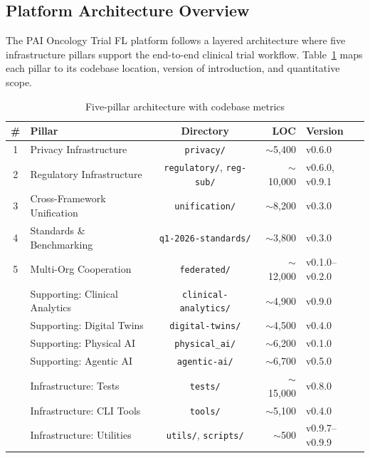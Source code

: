 \documentclass[10pt]{article}
\begin{document}
\subsection{Platform Architecture Overview}

The PAI Oncology Trial FL platform follows a layered architecture where five infrastructure pillars support the end-to-end clinical trial workflow. Table~\ref{tab:architecture} maps each pillar to its codebase location, version of introduction, and quantitative scope.

\begin{table}[H]
\centering
\caption{Five-pillar architecture with codebase metrics}
\label{tab:architecture}
\small
\begin{tabular}{@{}clcrl@{}}
\toprule
\textbf{\#} & \textbf{Pillar} & \textbf{Directory} & \textbf{LOC} & \textbf{Version} \\
\midrule
1 & Privacy Infrastructure & \texttt{privacy/} & $\sim$5,400 & v0.6.0 \\
2 & Regulatory Infrastructure & \texttt{regulatory/}, \texttt{reg-sub/} & $\sim$10,000 & v0.6.0, v0.9.1 \\
3 & Cross-Framework Unification & \texttt{unification/} & $\sim$8,200 & v0.3.0 \\
4 & Standards \& Benchmarking & \texttt{q1-2026-standards/} & $\sim$3,800 & v0.3.0 \\
5 & Multi-Org Cooperation & \texttt{federated/} & $\sim$12,000 & v0.1.0--v0.2.0 \\
\midrule
  & Supporting: Clinical Analytics & \texttt{clinical-analytics/} & $\sim$4,900 & v0.9.0 \\
  & Supporting: Digital Twins & \texttt{digital-twins/} & $\sim$4,500 & v0.4.0 \\
  & Supporting: Physical AI & \texttt{physical\_ai/} & $\sim$6,200 & v0.1.0 \\
  & Supporting: Agentic AI & \texttt{agentic-ai/} & $\sim$6,700 & v0.5.0 \\
  & Infrastructure: Tests & \texttt{tests/} & $\sim$15,000 & v0.8.0 \\
  & Infrastructure: CLI Tools & \texttt{tools/} & $\sim$5,100 & v0.4.0 \\
  & Infrastructure: Utilities & \texttt{utils/}, \texttt{scripts/} & $\sim$500 & v0.9.7--v0.9.9 \\
\bottomrule
\end{tabular}
\end{table}
\end{document}
